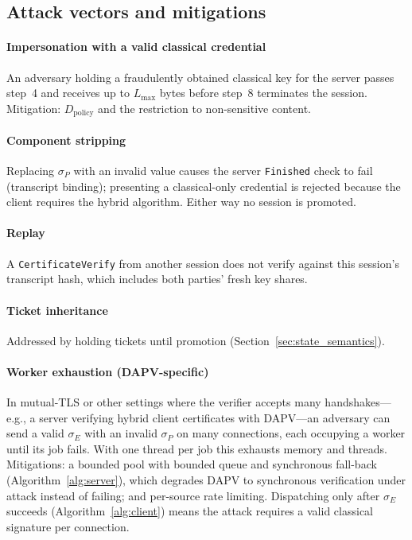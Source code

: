 \documentclass[preprint,10pt,3p]{elsarticle}
\begin{document}
\subsection{Attack vectors and mitigations}
\label{sec:attacks}

\paragraph{Impersonation with a valid classical credential}  An adversary
holding a fraudulently obtained classical key for the server passes step~4
and receives up to $L_\text{max}$ bytes before step~8 terminates the
session.  Mitigation: $D_\text{policy}$ and the restriction to
non-sensitive content.

\paragraph{Component stripping}  Replacing $\sigma_P$ with an invalid
value causes the server \texttt{Finished} check to fail (transcript
binding); presenting a classical-only credential is rejected because the
client requires the hybrid algorithm.  Either way no session is promoted.

\paragraph{Replay}  A \texttt{CertificateVerify} from another session does
not verify against this session's transcript hash, which includes both
parties' fresh key shares.

\paragraph{Ticket inheritance}  Addressed by holding tickets until
promotion (Section~\ref{sec:state_semantics}).

\paragraph{Worker exhaustion (DAPV-specific)}  In mutual-TLS or other
settings where the verifier accepts many handshakes---e.g., a server
verifying hybrid client certificates with DAPV---an adversary can send a
valid $\sigma_E$ with an invalid $\sigma_P$ on many connections, each
occupying a worker until its job fails.  With one thread per job this
exhausts memory and threads.  Mitigations: a bounded pool with bounded
queue and synchronous fall-back (Algorithm~\ref{alg:server}), which
degrades DAPV to synchronous verification under attack instead of failing;
and per-source rate limiting.  Dispatching only after $\sigma_E$ succeeds
(Algorithm~\ref{alg:client}) means the attack requires a valid classical
signature per connection.
\end{document}
